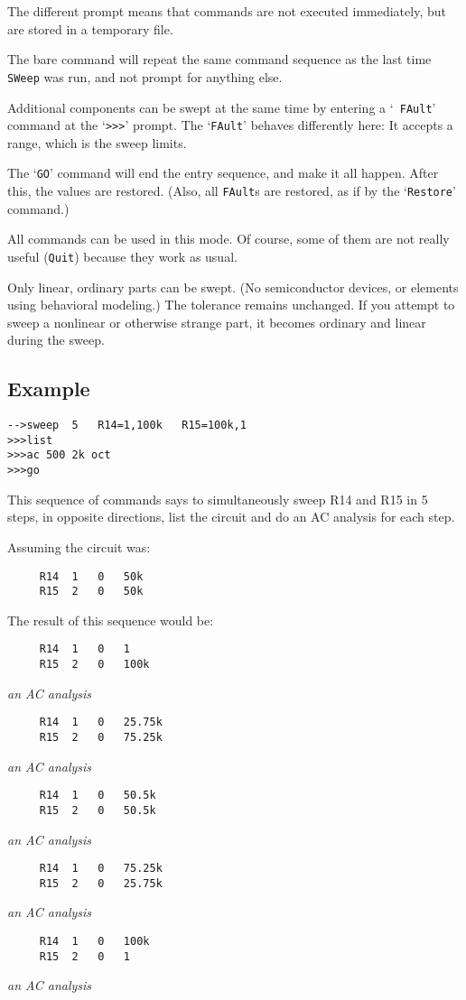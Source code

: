 The different prompt means that commands are not executed immediately, but
are stored in a temporary file.

The bare command will repeat the same command sequence as the last time {\tt
SWeep} was run, and not prompt for anything else.

Additional components can be swept at the same time by entering a `{\tt
FAult}' command at the `{\tt >>>}' prompt.  The `{\tt FAult}' behaves
differently here:  It accepts a range, which is the sweep limits.

The `{\tt GO}' command will end the entry sequence, and make it all happen.
After this, the values are restored.  (Also, all {\tt FAult}s are restored,
as if by the `{\tt Restore}' command.)

All commands can be used in this mode.  Of course, some of them are not
really useful ({\tt Quit}) because they work as usual.

Only linear, ordinary parts can be swept.  (No semiconductor devices, or
elements using behavioral modeling.)  The tolerance remains unchanged.  If
you attempt to sweep a nonlinear or otherwise strange part, it becomes
ordinary and linear during the sweep.
\subsection{Example}

\begin{verbatim}
-->sweep  5   R14=1,100k   R15=100k,1
>>>list
>>>ac 500 2k oct
>>>go
\end{verbatim}

This sequence of commands says to simultaneously sweep R14 and R15 in 5 steps,
in opposite directions, list the circuit and do an AC analysis for each step.

Assuming the circuit was:
\begin{verbatim}
     R14  1   0   50k
     R15  2   0   50k
\end{verbatim}

The result of this sequence would be:
\begin{verbatim}
     R14  1   0   1
     R15  2   0   100k
\end{verbatim}
{\rm {\it an AC analysis}}
\begin{verbatim}
     R14  1   0   25.75k
     R15  2   0   75.25k
\end{verbatim}
{\rm {\it an AC analysis}}
\begin{verbatim}
     R14  1   0   50.5k
     R15  2   0   50.5k
\end{verbatim}
{\rm {\it an AC analysis}}
\begin{verbatim}
     R14  1   0   75.25k
     R15  2   0   25.75k
\end{verbatim}
{\rm {\it an AC analysis}}
\begin{verbatim}
     R14  1   0   100k
     R15  2   0   1
\end{verbatim}
{\rm {\it an AC analysis}}

